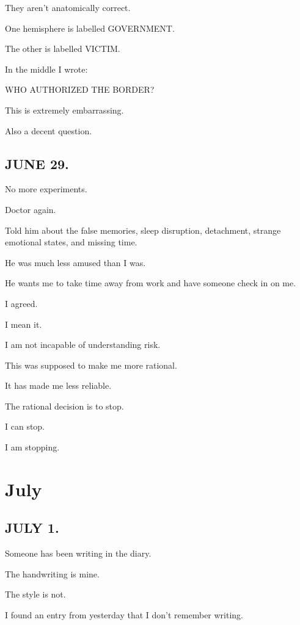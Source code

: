 \documentclass[11pt,oneside]{book}
\begin{document}
They aren't anatomically correct.

One hemisphere is labelled GOVERNMENT.

The other is labelled VICTIM.

In the middle I wrote:

WHO AUTHORIZED THE BORDER?

This is extremely embarrassing.

Also a decent question.

\section*{JUNE 29.}

No more experiments.

Doctor again.

Told him about the false memories, sleep disruption, detachment, strange emotional states, and missing time.

He was much less amused than I was.

He wants me to take time away from work and have someone check in on me.

I agreed.

I mean it.

I am not incapable of understanding risk.

This was supposed to make me more rational.

It has made me less reliable.

The rational decision is to stop.

I can stop.

I am stopping.

\chapter*{July}

\section*{JULY 1.}

Someone has been writing in the diary.

The handwriting is mine.

The style is not.

I found an entry from yesterday that I don't remember writing.
\end{document}
